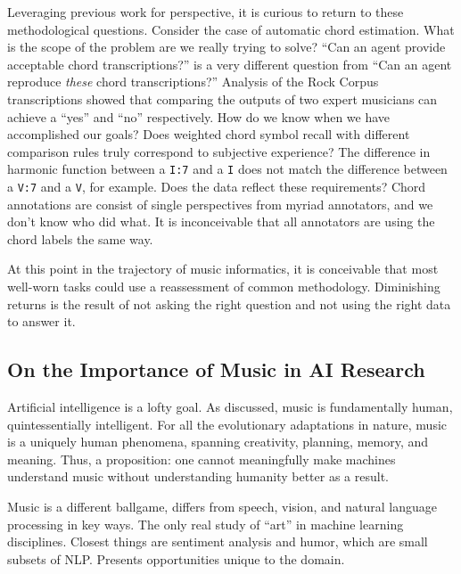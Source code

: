 Leveraging previous work for perspective, it is curious to return to these methodological questions.
Consider the case of automatic chord estimation.
What is the scope of the problem are we really trying to solve?
``Can an agent provide acceptable chord transcriptions?'' is a very different question from ``Can an agent reproduce \emph{these} chord transcriptions?''
Analysis of the Rock Corpus transcriptions showed that comparing the outputs of two expert musicians can achieve a ``yes'' and ``no'' respectively.
How do we know when we have accomplished our goals?
Does weighted chord symbol recall with different comparison rules truly correspond to subjective experience?
The difference in harmonic function between a \texttt{I:7} and a \texttt{I} does not match the difference between a \texttt{V:7} and a \texttt{V}, for example.
Does the data reflect these requirements?
Chord annotations are consist of single perspectives from myriad annotators, and we don't know who did what.
It is inconceivable that all annotators are using the chord labels the same way.

At this point in the trajectory of music informatics, it is conceivable that most well-worn tasks could use a reassessment of common methodology.
Diminishing returns is the result of not asking the right question and not using the right data to answer it.


\subsection{On the Importance of Music in AI Research}

Artificial intelligence is a lofty goal.
As discussed, music is fundamentally human, quintessentially intelligent.
For all the evolutionary adaptations in nature, music is a uniquely
human phenomena, spanning creativity, planning, memory, and meaning.
Thus, a proposition: one cannot meaningfully make machines understand music without understanding humanity better as a result.

Music is a different ballgame, differs from speech, vision, and natural
language processing in key ways.
The only real study of ``art'' in machine learning disciplines.
Closest things are sentiment analysis and humor, which are small subsets of NLP.
Presents opportunities unique to the domain.

